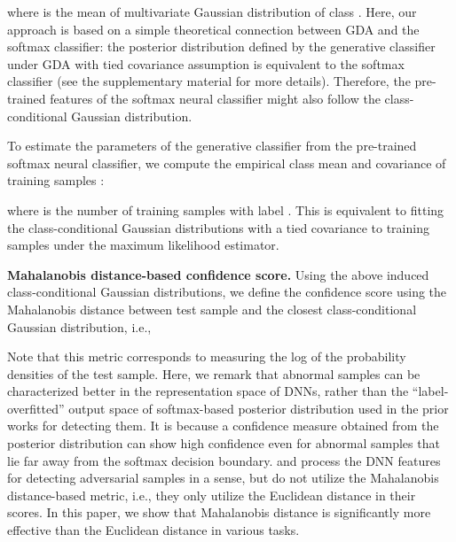 \documentclass{article}
\begin{document}
where  is the mean of multivariate Gaussian distribution of class .
Here, our approach is based on a simple theoretical connection between GDA and the softmax classifier: the posterior distribution defined by the generative classifier under GDA with tied covariance assumption is equivalent to the softmax classifier (see the supplementary material for more details).
Therefore, the pre-trained features of the softmax neural classifier  might also follow the class-conditional Gaussian distribution.

To estimate the parameters of the generative classifier from the pre-trained softmax neural classifier,
we compute the empirical class mean and covariance of training samples :

where  is the number of training samples with label .
This is equivalent to fitting the class-conditional Gaussian distributions with a tied covariance to training samples under the maximum likelihood estimator.


{\bf Mahalanobis distance-based confidence score.}
Using the above induced class-conditional Gaussian distributions, 
we define the confidence score  using the Mahalanobis distance between test sample  and the closest class-conditional Gaussian distribution, i.e.,

Note that this metric corresponds to measuring the log of the
probability densities of the test sample.
Here, we remark that abnormal samples can be characterized better in the representation space of DNNs, rather than the ``label-overfitted'' output space of softmax-based posterior distribution used in the prior works \cite{hendrycks2016baseline, liang2017principled} for detecting them.
It is because a confidence measure obtained from the posterior distribution can show high confidence even for abnormal samples that lie far away from the softmax decision boundary.
\citet{feinman2017detecting} and \citet{ma2018characterizing} process the DNN features for detecting adversarial samples in a sense, but do not utilize the Mahalanobis distance-based metric, i.e., they only utilize the Euclidean distance in their scores.
In this paper,
we show that Mahalanobis distance is significantly more effective than
the Euclidean distance in various tasks. 
\end{document}
